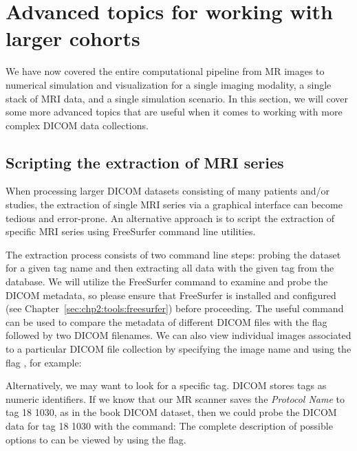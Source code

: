 \section{Advanced topics for working with larger cohorts}
\label{sec:chp3:advanced}
We have now covered the entire computational pipeline from MR images
to numerical simulation and visualization for a single imaging
modality, a single stack of MRI data, and a single simulation
scenario. In this section, we will cover some more advanced topics
that are useful when it comes to working with more complex DICOM data
collections.

\subsection{Scripting the extraction of MRI series}

When processing larger DICOM datasets consisting of many patients
and/or studies, the extraction of single MRI series via a graphical
interface can become tedious and error-prone. An alternative approach
is to script the extraction of specific MRI series using FreeSurfer
command line utilities.

%
%
The extraction process consists of two command line steps: probing the
dataset for a given tag name and then extracting all data with the
given tag from the database. We will utilize the FreeSurfer command
 to examine and probe the DICOM metadata, so
please ensure that FreeSurfer is installed and configured (see
Chapter~\ref{sec:chp2:tools:freesurfer}) before proceeding. The useful
command  can be used to compare the metadata of
different DICOM files with the flag  followed by two
DICOM filenames. We can also view individual images associated to a
particular DICOM file collection by specifying the image name and
using the flag , for example:

\noindent Alternatively, we may want to look for a specific tag. DICOM stores 
tags as numeric identifiers. If we know that our MR scanner saves the 
\textit{Protocol Name} to tag 18 1030, as in the book DICOM dataset, then we 
could probe the DICOM data for tag 18 1030 with the command:
%
\noindent The complete description of possible options to
 can be viewed by using the  flag.


